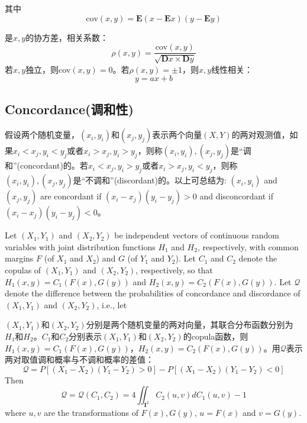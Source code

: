 其中
\begin{equation}
    \text{cov}(x,y) = \mathbf{E}(x-\mathbf{E}x) (y-\mathbf{E}y)
    \label{eq-covariation}
\end{equation}

是$x,y$的协方差，相关系数：
\begin{equation}
    \rho (x,y) = \dfrac{\text{cov}(x,y)}{\sqrt{\mathbf{D}x\times\mathbf{D}y}}
    \label{eq-coefficient}
\end{equation}
若$x,y$独立，则cov$(x,y) = 0$。若$\rho(x,y) = \pm 1$，则$x,y$线性相关：
\begin{equation*}
    y = ax+b
\end{equation*}


\subsection{Concordance(调和性)}
假设两个随机变量，$(x_i,y_i)$和$(x_j,y_j)$表示两个向量$(X,Y)$的两对观测值，如果$x_i<x_j,y_i<y_j$或者$x_i>x_j,y_i>y_j$，则称$(x_i,y_i),(x_j,y_j)$是``调和''(concordant)的。若$x_i<x_j,y_i>y_j$或者$x_i>x_j,y_i<y_j$，则称$(x_i,y_i),(x_j,y_j)$是``不调和''(discordant)的。以上可总结为:
$(x_i,y_i)$ and $(x_j,y_j)$ are concordant if $(x_i-x_j)(y_i-y_j)>0$ and disconcordant if $(x_i-x_j)(y_i-y_j)<0$。

\begin{theorem}\cite{Bill2000An}
    Let $(X_1,Y_1)$ and $(X_2,Y_2)$ be independent vectors of continuous random variables with joint distribution functions $H_1$ and $H_2$, respectively, with common margins $F$ (of $X_1$ and $X_2$) and $G$ (of $Y_1$ and $Y_2$). Let $C_1$ and $C_2$ denote the copulas of $(X_1,Y_1)$ and $(X_2,Y_2)$, respectively, so that $H_1(x,y) = C_1(F(x), G(y))$ and $H_2(x,y) = C_2(F(x),G(y))$. Let $\mathcal{Q}$ denote the difference between the probabilities of concordance and discordance of $(X_1,Y_1)$ and $(X_2,Y_2)$, i.e., let

    $(X_1,Y_1)$和$(X_2,Y_2)$分别是两个随机变量的两对向量，其联合分布函数分别为$H_1$和$H_2$。$C_1$和$C_2$分别表示$(X_1,Y_1)$和$(X_2,Y_2)$的copula函数，则$H_1(x,y) = C_1(F(x),G(y))$，$H_2(x,y) = C_2(F(x),G(y))$。用$\mathcal{Q}$表示两对取值调和概率与不调和概率的差值：
    \begin{equation}
        \mathcal{Q} = P [(X_1-X_2)(Y_1-Y_2) > 0] - P[(X_1-X_2)(Y_1-Y_2)<0]
        \label{eq-diff}
    \end{equation}
    Then
    \begin{equation}
        \mathcal{Q} = \mathcal{Q}(C_1,C_2) = 4 \iint_{\mathbf{I}^2}C_2(u,v)dC_1(u,v)-1
        \label{eq-diff2}
    \end{equation}
    where $u,v$ are the transformations of $F(x),G(y)$, $u=F(x)$ and $v = G(y)$.
    \label{th5.1.1}
\end{theorem}



